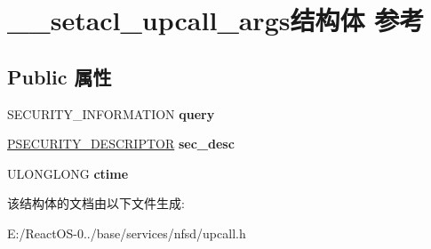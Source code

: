 \hypertarget{struct____setacl__upcall__args}{}\section{\+\_\+\+\_\+setacl\+\_\+upcall\+\_\+args结构体 参考}
\label{struct____setacl__upcall__args}
\subsection*{Public 属性}
\begin{DoxyCompactItemize}
\item 
\mbox{\label{struct____setacl__upcall__args_af2b2018ec51949a2cb41d90edaa6315f}} 
S\+E\+C\+U\+R\+I\+T\+Y\+\_\+\+I\+N\+F\+O\+R\+M\+A\+T\+I\+ON {\bfseries query}
\item 
\mbox{\label{struct____setacl__upcall__args_a79e274aad4e40878ba68cee0976c60f4}} 
\hyperlink{struct___s_e_c_u_r_i_t_y___d_e_s_c_r_i_p_t_o_r}{P\+S\+E\+C\+U\+R\+I\+T\+Y\+\_\+\+D\+E\+S\+C\+R\+I\+P\+T\+OR} {\bfseries sec\+\_\+desc}
\item 
\mbox{\label{struct____setacl__upcall__args_a3b8ace02f26d934385666027b37a9220}} 
U\+L\+O\+N\+G\+L\+O\+NG {\bfseries ctime}
\end{DoxyCompactItemize}


该结构体的文档由以下文件生成\+:\begin{DoxyCompactItemize}
\item 
E\+:/\+React\+O\+S-\/0../base/services/nfsd/upcall.\+h\end{DoxyCompactItemize}
